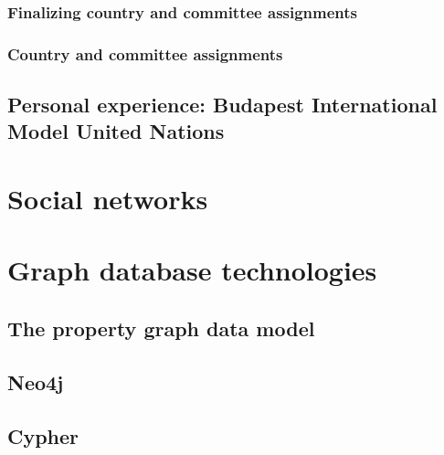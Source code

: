 \subsubsection{Finalizing country and committee assignments}

\subsubsection{Country and committee assignments}

\subsection{Personal experience: Budapest International Model United Nations}
\label{section:personalexperience}

\section{Social networks}

\section{Graph database technologies}
\subsection{The property graph data model}
\subsection{Neo4j}
\subsection{Cypher}
